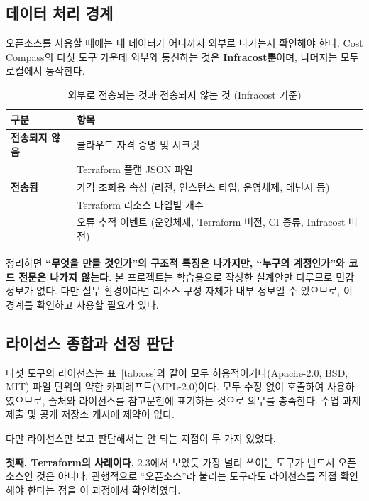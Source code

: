 \documentclass[10pt,a4paper]{article}
\begin{document}
\subsection{데이터 처리 경계}

오픈소스를 사용할 때에는 내 데이터가 어디까지 외부로 나가는지 확인해야 한다. Cost Compass의 다섯 도구 가운데 외부와 통신하는 것은 \textbf{Infracost뿐}이며, 나머지는 모두 로컬에서 동작한다.

\begin{table}[!h]
\centering
\caption{외부로 전송되는 것과 전송되지 않는 것 (Infracost 기준)}
\label{tab:boundary}
\footnotesize
\begin{tabularx}{\textwidth}{l Y}
\toprule
\textbf{구분} & \textbf{항목} \\
\midrule
\textbf{전송되지 않음} & 클라우드 자격 증명 및 시크릿 \\
                      & Terraform 플랜 JSON 파일 \\
\midrule
\textbf{전송됨} & 가격 조회용 속성 (리전, 인스턴스 타입, 운영체제, 테넌시 등) \\
                & Terraform 리소스 타입별 개수 \\
                & 오류 추적 이벤트 (운영체제, Terraform 버전, CI 종류, Infracost 버전) \\
\bottomrule
\end{tabularx}
\end{table}

정리하면 \textbf{``무엇을 만들 것인가''의 구조적 특징은 나가지만, ``누구의 계정인가''와 코드 전문은 나가지 않는다.} 본 프로젝트는 학습용으로 작성한 설계안만 다루므로 민감 정보가 없다. 다만 실무 환경이라면 리소스 구성 자체가 내부 정보일 수 있으므로, 이 경계를 확인하고 사용할 필요가 있다.

\subsection{라이선스 종합과 선정 판단}

다섯 도구의 라이선스는 표~\ref{tab:oss}와 같이 모두 허용적이거나(Apache-2.0, BSD, MIT) 파일 단위의 약한 카피레프트(MPL-2.0)이다. 모두 수정 없이 호출하여 사용하였으므로, 출처와 라이선스를 참고문헌에 표기하는 것으로 의무를 충족한다. 수업 과제 제출 및 공개 저장소 게시에 제약이 없다.

다만 라이선스만 보고 판단해서는 안 되는 지점이 두 가지 있었다.

\textbf{첫째, Terraform의 사례이다.} 2.3에서 보았듯 가장 널리 쓰이는 도구가 반드시 오픈소스인 것은 아니다. 관행적으로 ``오픈소스''라 불리는 도구라도 라이선스를 직접 확인해야 한다는 점을 이 과정에서 확인하였다.
\end{document}
